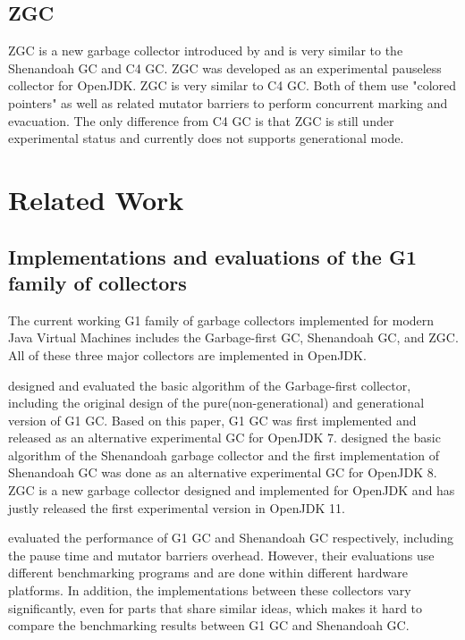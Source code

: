 \subsection{ZGC}

ZGC is a new garbage collector introduced by \cite{liden_karlsson_2018} and
is very similar to the Shenandoah GC and C4 GC. ZGC was developed as an experimental
pauseless collector for OpenJDK.
ZGC is very similar to C4 GC. Both of them use "colored pointers" as well as related
mutator barriers to perform concurrent marking and evacuation.
The only difference from C4 GC is that ZGC is still under experimental status and
currently does not supports generational mode.

\section{Related Work}
\label{sec:relatedwork}

\subsection{Implementations and evaluations of the G1 family of collectors}

The current working G1 family of garbage collectors implemented for modern Java Virtual Machines
includes the Garbage-first GC, Shenandoah GC, and ZGC.
All of these three major collectors are implemented in OpenJDK.

\cite{detlefs2004garbage} designed and evaluated the basic algorithm of the Garbage-first collector,
including the original design of the pure(non-generational) and generational version
of G1 GC. Based on this paper, G1 GC was first implemented and released as an alternative
experimental GC for OpenJDK 7. \cite{flood2016shenandoah} designed the basic algorithm
of the Shenandoah garbage collector and the first implementation of Shenandoah GC was done as an alternative experimental GC for OpenJDK 8.
ZGC is a new garbage collector designed and implemented for OpenJDK
and has justly released the first experimental version in OpenJDK 11.

\cite{detlefs2004garbage,flood2016shenandoah} evaluated the performance of G1 GC
and Shenandoah GC respectively, including the pause time and mutator barriers overhead.
However, their evaluations use different benchmarking programs and are done within
different hardware platforms. In addition, the implementations between these collectors
vary significantly, even for parts that share similar ideas, which makes it hard to
compare the benchmarking results between G1 GC and Shenandoah GC.

